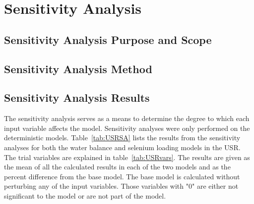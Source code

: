\chapter{Sensitivity Analysis}
\label{chap:SensitivityAnalysis}

\begin{linenumbers}
\section{Sensitivity Analysis Purpose and Scope}
\label{sec:PurposeAndScope}

\clearpage{}
\section{Sensitivity Analysis Method}
\label{sec:SAMethod}

\clearpage{}
\section{Sensitivity Analysis Results}
\label{sec:SAResults}

The sensitivity analysis serves as a means to determine the degree to which each input variable affects the model.  Sensitivity analyses were only performed on the deterministic models. Table~\ref{tab:USRSA} lists the results from the sensitivity analyses for both the water balance and selenium loading models in the USR.  The trial variables are explained in table~\ref{tab:USRvars}.  The results are given as the mean of all the calculated results in each of the two models and as the percent difference from the base model.  The base model is calculated without perturbing any of the input variables.  Those variables with "0" are either not significant to the model or are not part of the model.


\end{linenumbers}
